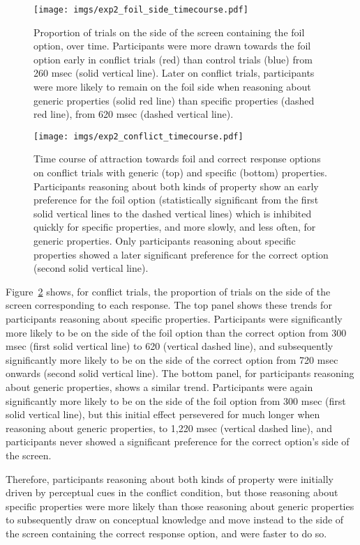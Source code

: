 \begin{figure}[tp]
  \centering
  \texttt{[image: imgs/exp2\_foil\_side\_timecourse.pdf]}
  \caption[Time course of attraction towards the foil, in Experiment 2.]{
    \label{fig:exp2_foil_side_timecourse}
    Proportion of trials on the side of the screen containing the foil option, over time.
    Participants were more drawn towards the foil option
    early in conflict trials (red) than control trials (blue)
    from  260 msec (solid vertical line).
    Later on conflict trials, participants were  more likely to remain on the foil side
    when reasoning about generic properties (solid red line)
    than specific properties (dashed red line),
    from 620 msec (dashed vertical line).
  }
\end{figure}

\begin{figure}[bp]
  \centering
  \texttt{[image: imgs/exp2\_conflict\_timecourse.pdf]}
  \caption[Time course for conflict trials, in Experiment 2.]{
    Time course of attraction towards foil and correct response options
    on conflict trials with generic (top) and specific (bottom) properties.
    Participants reasoning about both kinds of property
    show an early preference for the foil option
    (statistically significant from the first solid vertical lines to the dashed vertical lines)
    which is inhibited quickly for specific properties,
    and more slowly, and less often, for generic properties.
    Only participants reasoning about specific properties
    showed a later significant preference for the correct option (second solid vertical line).
    \label{fig:exp2_conflict_timecourse} }
\end{figure}

Figure~\ref{fig:exp2_conflict_timecourse} shows, for conflict trials,
the proportion of trials on the side of the screen corresponding to each response.
The top panel shows these trends for participants reasoning about specific properties.
Participants were significantly more likely to be on the side of the foil option than the correct option
from 300 msec (first solid vertical line) to 620 (vertical dashed line),
and subsequently significantly more likely to be on the side of the correct option
from 720 msec onwards (second solid vertical line).
The bottom panel, for participants reasoning about generic properties, shows a similar trend.
Participants were again significantly more likely to be on the side of the foil option
from 300 msec (first solid vertical line),
but this initial effect persevered for much longer when reasoning about generic properties,
to 1,220 msec (vertical dashed line),
and participants never showed a significant preference
for the correct option's side of the screen.

Therefore, participants reasoning about both kinds of property
were initially driven by perceptual cues in the conflict condition,
but those reasoning about specific properties
were more likely than those reasoning about generic properties
to subsequently draw on conceptual knowledge
and move instead to the side of the screen
containing the correct response option,
and were faster to do so.

\FloatBarrier
